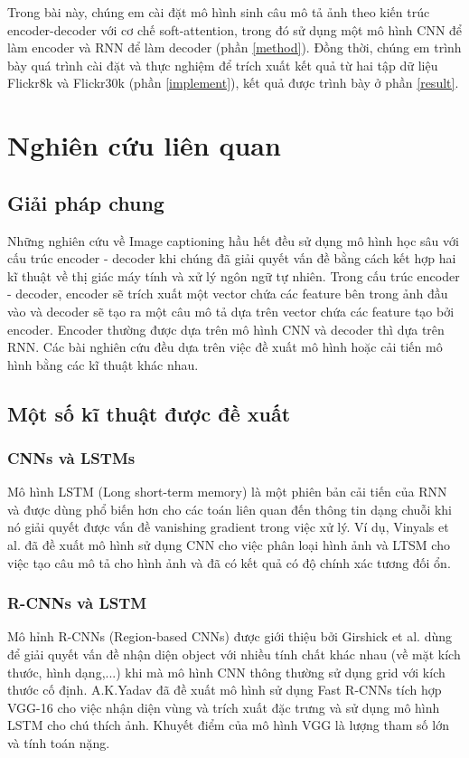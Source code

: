 \documentclass[conference]{IEEEtran}
\begin{document}
Trong bài này, chúng em cài đặt mô hình sinh câu mô tả ảnh theo kiến trúc encoder-decoder với cơ chế soft-attention, trong đó sử dụng một mô hình CNN để làm encoder và RNN để làm decoder (phần \ref{method}).
Đồng thời, chúng em trình bày quá trình cài đặt và thực nghiệm để trích xuất kết quả từ hai tập dữ liệu Flickr8k\cite{hodosh2013framing} và Flickr30k\cite{young2014image} (phần \ref{implement}), kết quả được trình bày ở phần \ref{result}.

\section{Nghiên cứu liên quan}
\subsection{Giải pháp chung}
Những nghiên cứu về Image captioning hầu hết đều sử dụng mô hình học sâu với cấu trúc encoder - decoder khi chúng đã giải quyết vấn đề bằng cách kết hợp hai kĩ thuật về thị giác máy tính và xử lý ngôn ngữ tự nhiên.
Trong cấu trúc encoder - decoder, encoder sẽ trích xuất một vector chứa các feature bên trong ảnh đầu vào và decoder sẽ tạo ra một câu mô tả dựa trên vector chứa các feature tạo bởi encoder.
Encoder thường được dựa trên mô hình CNN và decoder thì dựa trên RNN. Các bài nghiên cứu đều dựa trên việc đề xuất mô hình hoặc cải tiến mô hình bằng các kĩ thuật khác nhau. 

\subsection{Một số kĩ thuật được đề xuất}
\subsubsection{CNNs và LSTMs} 
Mô hình LSTM (Long short-term memory) \cite{hochreiter1997long} là một phiên bản cải tiến của RNN và được dùng phổ biến hơn cho các toán liên quan đến thông tin dạng chuỗi khi nó giải quyết được vấn đề vanishing gradient trong việc xử lý. Ví dụ, Vinyals et al. đã đề xuất mô hình sử dụng CNN cho việc phân loại hình ảnh và LTSM cho việc tạo câu mô tả cho hình ảnh \cite{vinyals2015show} và đã có kết quả có độ chính xác tương đối ổn.
\subsubsection{R-CNNs và LSTM}
Mô hỉnh R-CNNs (Region-based CNNs) được giới thiệu bởi Girshick et al. \cite{girshick2014rich} dùng để giải quyết vấn đề nhận diện object với nhiều tính chất khác nhau (về mặt kích thước, hình dạng,...) khi mà mô hình CNN thông thường sử dụng grid với kích thước cố định. A.K.Yadav đã đề xuất mô hình sử dụng Fast R-CNNs tích hợp VGG-16 cho việc nhận diện vùng và trích xuất đặc trưng và sử dụng mô hình LSTM cho chú thích ảnh. Khuyết điểm của mô hình VGG là lượng tham số lớn và tính toán nặng.  
\end{document}
